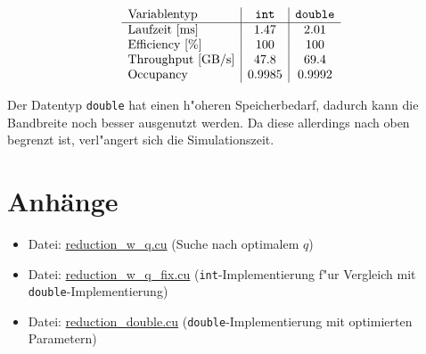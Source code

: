 \documentclass[%
	paper=A4,	%
	pagesize,	%
	DIV=calc,	%
	smallheadings,	%
	ngerman		%
]{scrartcl}
\begin{document}
\begin{eqnarray} \nonumber
	\begin{array}{l|c|c}
 \mbox{Variablentyp} & \mbox{\tt int} & \mbox{\tt double}\\ \hline
 \mbox{Laufzeit [ms]} & 1.47 & 2.01  \\ 
 \mbox{Efficiency [\%]} & 100 & 100 \\
 \mbox{Throughput [GB/s]} & 47.8 & 69.4  \\
 \mbox{Occupancy} & 0.9985 & 0.9992
	\end{array}
\end{eqnarray}

Der Datentyp \texttt{double} hat einen h"oheren Speicherbedarf, dadurch kann die Bandbreite noch besser ausgenutzt werden. Da diese allerdings nach oben begrenzt ist, verl"angert sich die Simulationszeit.

\section*{Anhänge}
\begin{itemize}
	\item Datei: \url{reduction_w_q.cu} (Suche nach optimalem $q$)
	\item Datei: \url{reduction_w_q_fix.cu} (\texttt{int}-Implementierung f"ur Vergleich mit \texttt{double}-Implementierung)
	\item Datei: \url{reduction_double.cu} (\texttt{double}-Implementierung mit optimierten Parametern)
\end{itemize}
\end{document}
